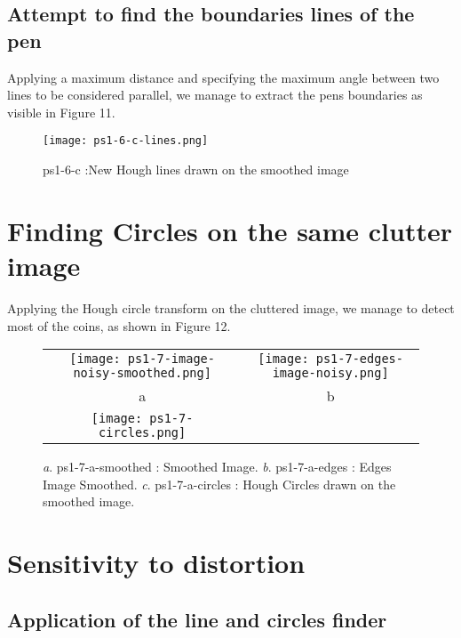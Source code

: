 \documentclass[a4paper,11pt]{article}
\begin{document}
\subsection{Attempt to find the boundaries lines of the pen}


Applying a maximum distance and specifying the maximum angle between two lines to be considered parallel, we manage to extract the pens boundaries as visible in Figure 11.

\begin{figure}[H]
\centering
\texttt{[image: ps1-6-c-lines.png]}
 \caption{ps1-6-c :New Hough lines drawn on the smoothed image}
\label{ps1-6-c}
\end{figure}

\section{Finding Circles on the same clutter image}


Applying the Hough circle transform on the cluttered image, we manage to detect most of the coins, as shown in Figure 12.

 \begin{figure}[H]
\begin{center}
\begin{tabular}{cc}
\texttt{[image: ps1-7-image-noisy-smoothed.png]}&
\texttt{[image: ps1-7-edges-image-noisy.png]}\\
	a&b\\
\texttt{[image: ps1-7-circles.png]}\\	
\end{tabular}
\end{center}
 \caption{
\textit{a}. ps1-7-a-smoothed : Smoothed Image.  \textit{b}. ps1-7-a-edges : Edges Image Smoothed. 
\textit{c}. ps1-7-a-circles :  Hough Circles drawn on the smoothed image.}
\label{ps1-7}
\end{figure}

\section{Sensitivity to distortion}

\subsection{Application of the line and circles finder}
\end{document}
